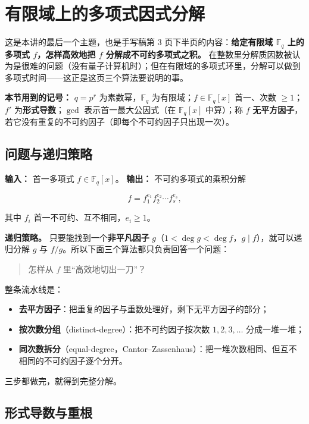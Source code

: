 \section{有限域上的多项式因式分解}


这是本讲的最后一个主题，也是手写稿第 3 页下半页的内容：\textbf{给定有限域 $\mathbb F_q$ 上的多项式 $f$，怎样高效地把 $f$ 分解成不可约多项式之积。} 在整数里分解质因数被认为是很难的问题（没有量子计算机时）；但在有限域的多项式环里，分解可以做到多项式时间——这正是这页三个算法要说明的事。

\textbf{本节用到的记号：} $q=p^r$ 为素数幂，$\mathbb F_q$ 为有限域；$f\in\mathbb F_q[x]$ 首一、次数 $\ge1$；$f'$ 为\textbf{形式导数}；$\gcd$ 表示首一最大公因式（在 $\mathbb F_q[x]$ 中算）；称 $f$ \textbf{无平方因子}，若它没有重复的不可约因子（即每个不可约因子只出现一次）。

\subsection{问题与递归策略}


\textbf{输入：} 首一多项式 $f\in\mathbb F_q[x]$。
\textbf{输出：} 不可约多项式的乘积分解

\[
f=f_1^{e_1}f_2^{e_2}\cdots f_s^{e_s},
\]

其中 $f_i$ 首一不可约、互不相同，$e_i\ge1$。

\textbf{递归策略。} 只要能找到一个\textbf{非平凡因子} $g$（$1<\deg g<\deg f$，$g\mid f$），就可以递归分解 $g$ 与 $f/g$。所以下面三个算法都只负责回答一个问题：

\begin{quote}
怎样从 $f$ 里“高效地切出一刀”？
\end{quote}


整条流水线是：

\begin{itemize}
\item \textbf{去平方因子}：把重复的因子与重数处理好，剩下无平方因子的部分；
\item \textbf{按次数分组}（distinct-degree）：把不可约因子按次数 $1,2,3,\dots$ 分成一堆一堆；
\item \textbf{同次数拆分}（equal-degree，Cantor–Zassenhaus）：把一堆次数相同、但互不相同的不可约因子逐个分开。
\end{itemize}


三步都做完，就得到完整分解。

\subsection{形式导数与重根}


